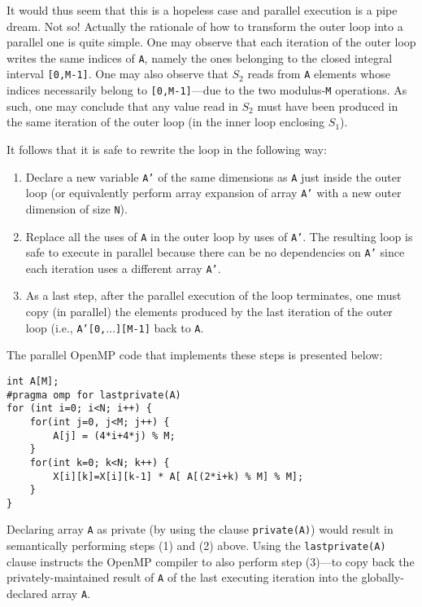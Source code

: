It would thus seem that this is a hopeless case and parallel
execution is a pipe dream. Not so! Actually the rationale
of how to transform the outer loop into a parallel one
is quite simple.  One may observe that each iteration of
the outer loop writes the same indices of \texttt{A}, namely
the ones belonging to the closed integral interval
\texttt{[0,M-1]}.   One may also observe that $S_2$ reads
from \texttt{A} elements whose indices necessarily belong to
\texttt{[0,M-1]}---due to the two modulus-\texttt{M} operations.
As such, one may conclude that any value
read in $S_2$ must have been produced in the same iteration
of the outer loop (in the inner loop enclosing $S_1$).

It follows that it is safe to rewrite the loop in the
following way:
\begin{enumerate}
\item Declare a new variable \texttt{A'} of the same dimensions as
  \texttt{A} just inside the outer loop (or equivalently perform array
  expansion of array \texttt{A'} with a new outer dimension of size
  \texttt{N}).
\item Replace all the uses of \texttt{A} in the outer loop by uses of
  \texttt{A'}.  The resulting loop is safe to execute in parallel
  because there can be no dependencies on \texttt{A'} since each
  iteration uses a different array \texttt{A'}.
\item As a last step, after the parallel execution of the loop
  terminates, one must copy (in parallel) the elements produced by the
  last iteration of the outer loop (i.e., \texttt{A'[0,$\ldots$][M-1]}
  back to \texttt{A}.
\end{enumerate}

The parallel OpenMP code that implements these steps is
presented below:

\begin{lstlisting}[mathescape=true]
int A[M];
#pragma omp for lastprivate(A)
for (int i=0; i<N; i++) {
    for(int j=0, j<M; j++) {
        A[j] = (4*i+4*j) % M;
    }
    for(int k=0; k<N; k++) {
        X[i][k]=X[i][k-1] * A[ A[(2*i+k) % M] % M];
    }
}
\end{lstlisting}

Declaring array \texttt{A} as private (by using the clause
\texttt{private(A)}) would result in semantically performing steps (1)
and (2) above. Using the \texttt{lastprivate(A)} clause instructs the
OpenMP compiler to also perform step (3)---to copy back the
privately-maintained result of \texttt{A} of the last executing
iteration into the globally-declared array \texttt{A}.

